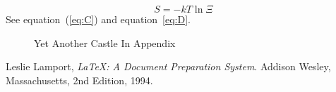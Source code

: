 \documentclass{template/openetcs_report}
\begin{document}
\lipsum[16-22]
\begin{equation}
  \label{eq:U}
  S = -kT\ln\Xi
\end{equation}
See equation~(\ref{eq:C}) and equation~\eqref{eq:D}.

\begin{figure}
  \centering
  \caption{Yet Another Castle In Appendix}
  \label{fig:castle2}
\end{figure}

\begin{thebibliography}{9}

  Leslie Lamport,
  \emph{\LaTeX: A Document Preparation System}.
  Addison Wesley, Massachusetts,
  2nd Edition,
  1994.

\end{thebibliography}

\end{document}
